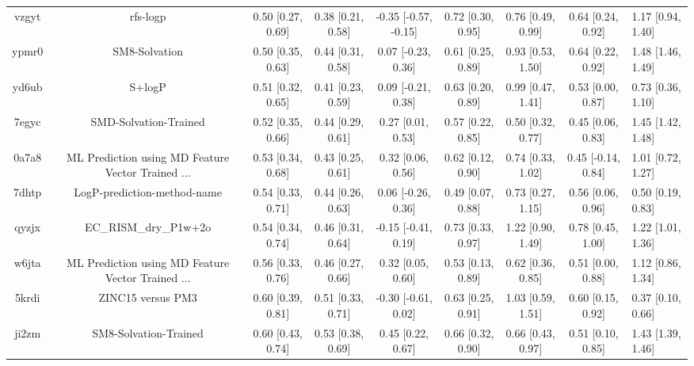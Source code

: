 \documentclass{article}
\begin{document}
\begin{center}
\begin{longtable}{|cccccccc|}
 vzgyt &                                           rfs-logp &  0.50 [0.27, 0.69] &  0.38 [0.21, 0.58] &  -0.35 [-0.57, -0.15] &  0.72 [0.30, 0.95] &    0.76 [0.49, 0.99] &    0.64 [0.24, 0.92] &     1.17 [0.94, 1.40] \\
 ypmr0 &                                      SM8-Solvation &  0.50 [0.35, 0.63] &  0.44 [0.31, 0.58] &    0.07 [-0.23, 0.36] &  0.61 [0.25, 0.89] &    0.93 [0.53, 1.50] &    0.64 [0.22, 0.92] &     1.48 [1.46, 1.49] \\
 yd6ub &                                             S+logP &  0.51 [0.32, 0.65] &  0.41 [0.23, 0.59] &    0.09 [-0.21, 0.38] &  0.63 [0.20, 0.89] &    0.99 [0.47, 1.41] &    0.53 [0.00, 0.87] &     0.73 [0.36, 1.10] \\
 7egyc &                              SMD-Solvation-Trained &  0.52 [0.35, 0.66] &  0.44 [0.29, 0.61] &     0.27 [0.01, 0.53] &  0.57 [0.22, 0.85] &    0.50 [0.32, 0.77] &    0.45 [0.06, 0.83] &     1.45 [1.42, 1.48] \\
 0a7a8 &  ML Prediction using MD Feature Vector Trained ... &  0.53 [0.34, 0.68] &  0.43 [0.25, 0.61] &     0.32 [0.06, 0.56] &  0.62 [0.12, 0.90] &    0.74 [0.33, 1.02] &   0.45 [-0.14, 0.84] &     1.01 [0.72, 1.27] \\
 7dhtp &                        LogP-prediction-method-name &  0.54 [0.33, 0.71] &  0.44 [0.26, 0.63] &    0.06 [-0.26, 0.36] &  0.49 [0.07, 0.88] &    0.73 [0.27, 1.15] &    0.56 [0.06, 0.96] &     0.50 [0.19, 0.83] \\
 qyzjx &                              EC\_RISM\_dry\_P1w+2o &  0.54 [0.34, 0.74] &  0.46 [0.31, 0.64] &   -0.15 [-0.41, 0.19] &  0.73 [0.33, 0.97] &    1.22 [0.90, 1.49] &    0.78 [0.45, 1.00] &     1.22 [1.01, 1.36] \\
 w6jta &  ML Prediction using MD Feature Vector Trained ... &  0.56 [0.33, 0.76] &  0.46 [0.27, 0.66] &     0.32 [0.05, 0.60] &  0.53 [0.13, 0.89] &    0.62 [0.36, 0.85] &    0.51 [0.00, 0.88] &     1.12 [0.86, 1.34] \\
 5krdi &                                  ZINC15 versus PM3 &  0.60 [0.39, 0.81] &  0.51 [0.33, 0.71] &   -0.30 [-0.61, 0.02] &  0.63 [0.25, 0.91] &    1.03 [0.59, 1.51] &    0.60 [0.15, 0.92] &     0.37 [0.10, 0.66] \\
 ji2zm &                              SM8-Solvation-Trained &  0.60 [0.43, 0.74] &  0.53 [0.38, 0.69] &     0.45 [0.22, 0.67] &  0.66 [0.32, 0.90] &    0.66 [0.43, 0.97] &    0.51 [0.10, 0.85] &     1.43 [1.39, 1.46] \\

\end{longtable}
\end{center}
\end{document}
